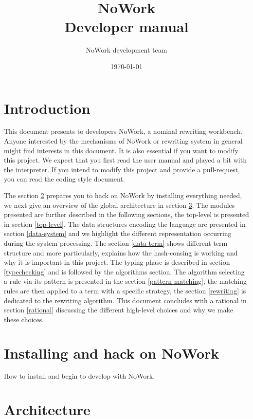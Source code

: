 \documentclass[12pt,a4paper]{article}
\title{NoWork\\
Developer manual}
\author{NoWork development team\\[2em]}
\date\today
\begin{document}
\maketitle

\section{Introduction}

This document presents to developers NoWork, a nominal rewriting workbench. Anyone interested by the mechanisms of NoWork or rewriting system in general might find interests in this document. It is also essential if you want to modify this project. We expect that you first read the user manual and played a bit with the interpreter. If you intend to modify this project and provide a pull-request, you can read the coding style document.
\newline

The section \ref{install} prepares you to hack on NoWork by installing everything needed, we next give an overview of the global architecture in section \ref{architecture}. The modules presented are further described in the following sections, the top-level is presented in section \ref{top-level}. The data structures encoding the language are presented in section \ref{data-system} and we highlight the different representation occurring during the system processing. The section \ref{data-term} shows different term structure and more particularly, explains how the hash-consing is working and why it is important in this project. The typing phase is described in section \ref{typechecking} and is followed by the algorithms section. The algorithm selecting a rule via its pattern is presented in the section \ref{pattern-matching}, the matching rules are then applied to a term with a specific strategy, the section \ref{rewriting} is dedicated to the rewriting algorithm. This document concludes with a rational in section \ref{rational} discussing the different high-level choices and why we make these choices.

\section{Installing and hack on NoWork}
\label{install}
How to install and begin to develop with NoWork.

\section{Architecture}
\label{architecture}
\end{document}

